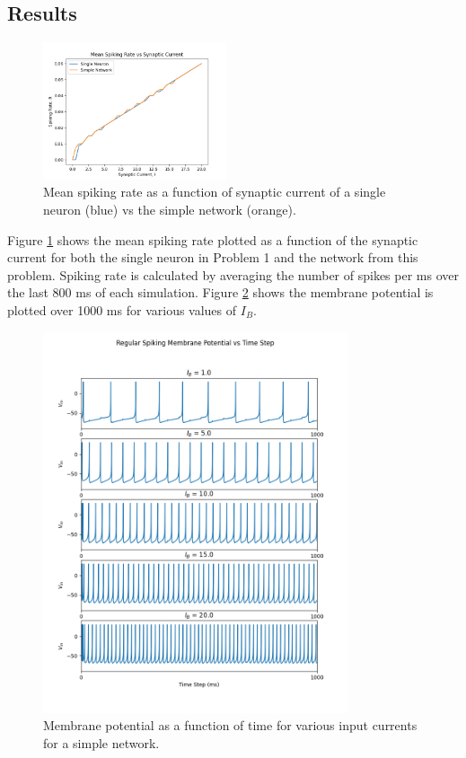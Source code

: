 \documentclass[a4paper, 11pt, titlepage]{article}
\newcommand{\figRef}[1]{Figure \ref{#1}}
\begin{document}
  \subsection{Results}
  \begin{figure}
    \centering
    \vspace{-40pt}
    \includegraphics[width=0.48\textwidth]{images/spike_rate_network.png}
    \vspace{-10pt}
    \caption{
      Mean spiking rate as a function of synaptic current of a single neuron
      (blue) vs the simple network (orange).
    }
    \vspace{-10pt}
    \label{fig:rNetwork}
  \end{figure}
  \figRef{fig:rNetwork} shows the mean spiking rate plotted as a function of
  the synaptic current for both the single neuron in Problem 1 and the network
  from this problem.
  Spiking rate is calculated by averaging the number of spikes per ms over the
  last 800 ms of each simulation.
  \figRef{fig:vNetwork} shows the membrane potential is plotted over 1000 ms
  for various values of $I_{B}$.
  \begin{figure}[ht]
    \centering
    \includegraphics[width=0.8\textwidth]{images/v_mem_plot_network.png}
    \vspace{-20pt}
    \caption{
      Membrane potential as a function of time for various input currents for a
      simple network.
    }
    \label{fig:vNetwork}
  \end{figure}
\end{document}
